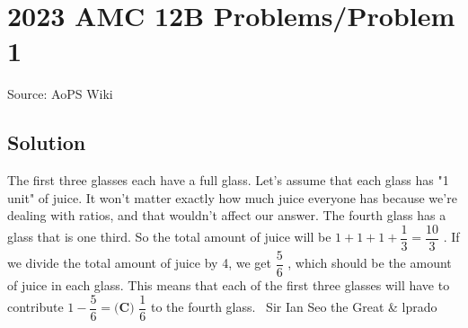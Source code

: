 \documentclass[12pt]{article}
\begin{document}
\section*{{2023 AMC 12B Problems/Problem 1}}
Source: AoPS Wiki

\subsection*{Solution}
The first three glasses each have a full glass. Let's assume that each glass has "1 unit" of juice. It won't matter exactly how much juice everyone has because we're dealing with ratios, and that wouldn't affect our answer. The fourth glass has a glass that is one third. So the total amount of juice will be $1+1+1+\dfrac{1}{3} = \dfrac{10}{3}$ . If we divide the total amount of juice by 4, we get $\dfrac{5}{6}$ , which should be the amount of juice in each glass. This means that each of the first three glasses will have to contribute $1 - \dfrac{5}{6} = \boxed{\textbf{(C) }\dfrac16}$ to the fourth glass. ~Sir Ian Seo the Great & lprado
\end{document}
